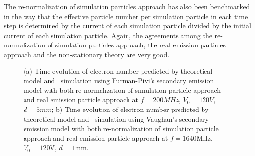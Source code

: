 \documentclass[aps,prstab,superscriptaddress,showpacs]{revtex4-1}
\begin{document}
The re-normalization of simulation particles approach has also been benchmarked in the way that the effective particle number per simulation particle in each time step is determined by the current of each simulation particle divided by the initial current of each simulation particle. Again, the agreements among the re-normalization of simulation particles approach, the real emission particles approach and the non-stationary theory are very good.
\begin{figure}[H] 
  \caption{(a) Time evolution of electron number predicted by theoretical model and \opal\ simulation using Furman-Pivi's secondary emission model with both re-normalization of simulation particle approach and real emission particle approach at $f=200MHz$, $V_0=120V$, $d=5mm$; b) Time evolution of electron number predicted by theoretical model and \opal\ simulation using Vaughan's secondary emission model with both re-normalization of simulation particle approach and real emission particle approach at $f=1640$MHz, $V_0=120$V, $d=1$mm.} 
  \label{const_simu} %
\end{figure}
\end{document}
